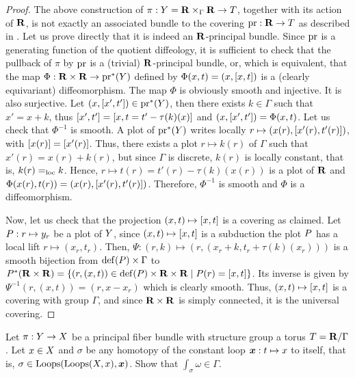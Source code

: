 \begin{proof}
  The above construction of $\pi : \Y = \RR \times_\Gamma \RR \to \Torus$,
  together with its action of $\RR$,
  is not exactly an associated bundle to the covering $\pr : \RR \to \Torus$ as described in .
  Let us prove directly that it is indeed an $\RR$-principal bundle.
  Since $\pr$ is a generating function of the quotient diffeology,
  it is sufficient to check that the pullback of $\pi$ by $\pr$ is a (trivial) $\RR$-principal bundle,
  or,
  which is equivalent,
  that the map $\Phi : \RR \times \RR \to \pr^*(\Y)$ defined by $\Phi(x,t) = (x,\cl{x,t})$ is a (clearly equivariant) diffeomorphism.
  The map $\Phi$ is obviously smooth and injective.
  It is also surjective.
  Let $(x,\cl{x',t'}) \in \pr^*(\Y)$,
  then there exists $k \in \Gamma$ such that $x' = x +k$,
  thus $\cl{x',t'} = \cl{x, t = t' - \tau(k)(x)}$ and $(x,\cl{x',t'}) = \Phi(x,t)$.
  Let us check that $\Phi^{-1}$ is smooth.
  A plot of $\pr^*(\Y)$ writes locally $r \mapsto (x(r), \cl{x'(r),t'(r)})$,
  with $\cl{x(r)} = \cl{x'(r)}$.
  Thus,
  there exists a plot $r \mapsto k(r)$ of $\Gamma$ such that $x'(r) = x(r) + k(r)$,
  but since $\Gamma$ is discrete,
  $k(r)$ is locally constant,
  that is,
  $k(r)=_\loc k$.
  Hence,
  $r \mapsto t(r) = t'(r) - \tau(k)(x(r))$ is a plot of $\RR$ and $\Phi(x(r),t(r)) = (x(r), \cl{x'(r),t'(r)})$.
  Therefore,
  $\Phi^{-1}$ is smooth and $\Phi$ is a diffeomorphism.
  
  Now,
  let us check that the projection $(x,t) \mapsto \cl{x,t}$ is a covering as claimed.
  Let $\P : r \mapsto y_r$ be a plot of $\Y$,
  since $(x,t) \mapsto \cl{x,t}$ is a subduction the plot $\P$ has a local lift $r \mapsto (x_r,t_r)$.
  Then,
  $\Psi : (r,k) \mapsto (r,(x_r + k, t_r + \tau(k)(x_r)))$ is a smooth bijection from $\Dom(\P) \times \Gamma$ to $\P^*(\RR \times \RR) = \{(r,(x,t)) \in \Dom(\P) \times \RR \times \RR \mid \P(r) = \cl{x,t} \}$.
  Its inverse is given by $\Psi^{-1}(r,(x,t)) = (r,x-x_r)$ which is clearly smooth.
  Thus,
  $(x,t) \mapsto \cl{x,t}$ is a covering with group $\Gamma$,
  and since $\RR \times \RR$ is simply connected,
  it is the universal covering.
\end{proof}

%
%

\Exercises

\begin{exercise}
  \label{Spheric-periods-on-toric-bundles}
  Let $\pi : \Y \to \X$ be a principal fiber bundle with structure group a torus $\Torus = \RR/\Gamma$ .
  Let $x \in \X$ and $\sigma$ be any homotopy of the constant loop $\bmx : t \mapsto x$ to itself,
  that is,
  $\sigma \in \Loops(\Loops(\X,x), \bmx)$.
  Show that $\int_{\sigma} \omega \in \Gamma$.
\end{exercise} %

